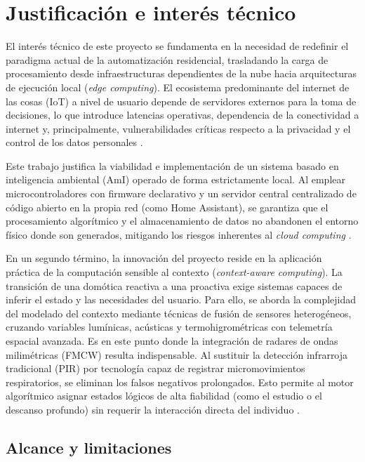 \section{Justificación e interés técnico}
El interés técnico de este proyecto se fundamenta en la necesidad de redefinir el paradigma actual de la automatización residencial, trasladando la carga de procesamiento desde infraestructuras dependientes de la nube hacia arquitecturas de ejecución local (\textit{edge computing}). El ecosistema predominante del internet de las cosas (IoT) a nivel de usuario depende de servidores externos para la toma de decisiones, lo que introduce latencias operativas, dependencia de la conectividad a internet y, principalmente, vulnerabilidades críticas respecto a la privacidad y el control de los datos personales \cite{perera2014context}.

Este trabajo justifica la viabilidad e implementación de un sistema basado en inteligencia ambiental (AmI) operado de forma estrictamente local. Al emplear microcontroladores con firmware declarativo y un servidor central centralizado de código abierto en la propia red (como Home Assistant), se garantiza que el procesamiento algorítmico y el almacenamiento de datos no abandonen el entorno físico donde son generados, mitigando los riesgos inherentes al \textit{cloud computing} \cite{shi2016edge}.

En un segundo término, la innovación del proyecto reside en la aplicación práctica de la computación sensible al contexto (\textit{context-aware computing}). La transición de una domótica reactiva a una proactiva exige sistemas capaces de inferir el estado y las necesidades del usuario. Para ello, se aborda la complejidad del modelado del contexto mediante técnicas de fusión de sensores heterogéneos, cruzando variables lumínicas, acústicas y termohigrométricas con telemetría espacial avanzada. Es en este punto donde la integración de radares de ondas milimétricas (FMCW) resulta indispensable. Al sustituir la detección infrarroja tradicional (PIR) por tecnología capaz de registrar micromovimientos respiratorios, se eliminan los falsos negativos prolongados. Esto permite al motor algorítmico asignar estados lógicos de alta fiabilidad (como el estudio o el descanso profundo) sin requerir la interacción directa del individuo \cite{turppa2020vital}.


\subsection{Alcance y limitaciones}

